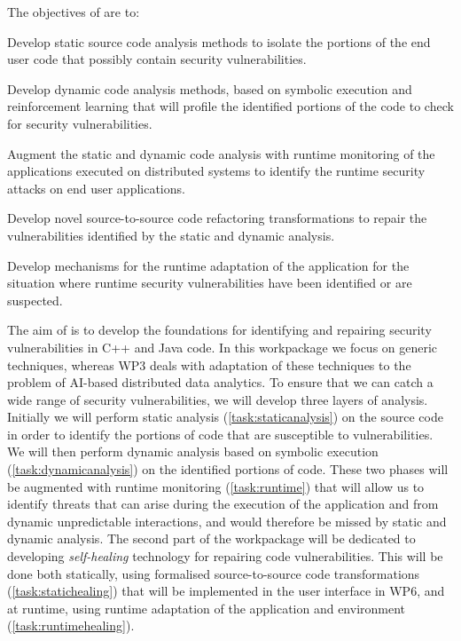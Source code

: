 \addtocounter{wpno}{1}
\begin{Workpackage}{\thewpno}
\WPTitle{\wpname{\thewpno}}



\begin{WPObjectives}
The objectives of \theWP{} are to:
\begin{compactitem}
\item Develop static source code analysis methods to isolate the portions of the end user code that possibly contain security vulnerabilities.
\item Develop dynamic code analysis methods, based on symbolic execution and reinforcement learning that will profile the identified portions of the code to check for security vulnerabilities.
\item Augment the static and dynamic code analysis with runtime monitoring of the applications executed on distributed systems to identify the runtime security attacks on end user applications.
\item Develop novel source-to-source code refactoring transformations to repair the vulnerabilities identified by the static and dynamic analysis.
\item Develop mechanisms for the runtime adaptation of the application for the situation where runtime security vulnerabilities have been identified or are suspected.
\end{compactitem}
\end{WPObjectives}

\begin{WPDescription}
The aim of \theWP{} is to develop the foundations %
for identifying and repairing security vulnerabilities in C++ and Java code. In this workpackage we focus on generic techniques, whereas WP3 deals with adaptation of these techniques to the problem of AI-based distributed data analytics. To ensure that we can catch a wide range of security vulnerabilities, we will develop three layers of analysis. Initially we will perform static analysis (\ref{task:staticanalysis}) on the source code in order to identify the portions of code that are susceptible to vulnerabilities. We will then perform dynamic analysis based on symbolic execution (\ref{task:dynamicanalysis}) on the identified portions of code. These two phases will be augmented with runtime monitoring (\ref{task:runtime}) that will allow us to identify threats that can arise during the execution of the application and from dynamic unpredictable interactions, and would therefore be missed by static and dynamic analysis. The second part of the workpackage will be dedicated to developing \emph{self-healing} technology for repairing code vulnerabilities. This will be done both statically, using formalised source-to-source code transformations ({\ref{task:statichealing}}) that will be implemented in the user interface in WP6, and at runtime, using runtime adaptation of the application and environment (\ref{task:runtimehealing}).
\end{WPDescription}


\end{Workpackage}
